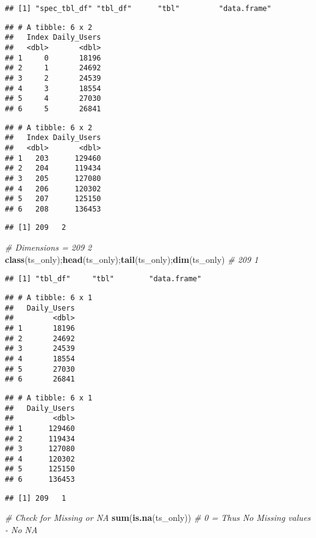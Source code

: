 \documentclass[]{article}
\newenvironment{Shaded}{\begin{snugshade}}{\end{snugshade}}
\newcommand{\CommentTok}[1]{\textcolor[rgb]{0.56,0.35,0.01}{\textit{#1}}}
\newcommand{\KeywordTok}[1]{\textcolor[rgb]{0.13,0.29,0.53}{\textbf{#1}}}
\newcommand{\NormalTok}[1]{#1}
\begin{document}
\begin{verbatim}
## [1] "spec_tbl_df" "tbl_df"      "tbl"         "data.frame"
\end{verbatim}

\begin{verbatim}
## # A tibble: 6 x 2
##   Index Daily_Users
##   <dbl>       <dbl>
## 1     0       18196
## 2     1       24692
## 3     2       24539
## 4     3       18554
## 5     4       27030
## 6     5       26841
\end{verbatim}

\begin{verbatim}
## # A tibble: 6 x 2
##   Index Daily_Users
##   <dbl>       <dbl>
## 1   203      129460
## 2   204      119434
## 3   205      127080
## 4   206      120302
## 5   207      125150
## 6   208      136453
\end{verbatim}

\begin{verbatim}
## [1] 209   2
\end{verbatim}

\begin{Shaded}
\begin{Highlighting}[]
\CommentTok{# Dimensions =  209   2}
\KeywordTok{class}\NormalTok{(ts_only);}\KeywordTok{head}\NormalTok{(ts_only);}\KeywordTok{tail}\NormalTok{(ts_only);}\KeywordTok{dim}\NormalTok{(ts_only) }\CommentTok{# 209   1}
\end{Highlighting}
\end{Shaded}

\begin{verbatim}
## [1] "tbl_df"     "tbl"        "data.frame"
\end{verbatim}

\begin{verbatim}
## # A tibble: 6 x 1
##   Daily_Users
##         <dbl>
## 1       18196
## 2       24692
## 3       24539
## 4       18554
## 5       27030
## 6       26841
\end{verbatim}

\begin{verbatim}
## # A tibble: 6 x 1
##   Daily_Users
##         <dbl>
## 1      129460
## 2      119434
## 3      127080
## 4      120302
## 5      125150
## 6      136453
\end{verbatim}

\begin{verbatim}
## [1] 209   1
\end{verbatim}

\begin{Shaded}
\begin{Highlighting}[]
\CommentTok{# Check for Missing or NA }
\KeywordTok{sum}\NormalTok{(}\KeywordTok{is.na}\NormalTok{(ts_only)) }\CommentTok{# 0 = Thus No Missing values - No NA }
\end{Highlighting}
\end{Shaded}
\end{document}
